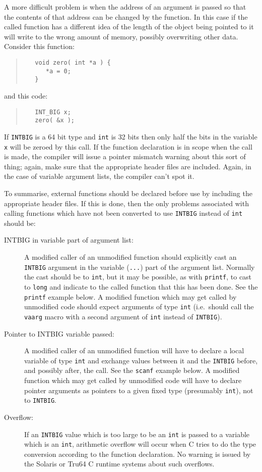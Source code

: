 \documentclass[twoside,11pt]{article}
\renewcommand{\_}{\texttt{\symbol{95}}}
\newcommand{\cc}[1]{{\tt #1}}
\newenvironment{squote}{\begin{quote}\begin{small}}{\end{small}\end{quote}}
\begin{document}
A more difficult problem is when the address of an argument is
passed so that the contents of that address can be changed by
the function.  In this case if the called function has a
different idea of the length of the object being pointed to
it will write to the wrong amount of memory, possibly overwriting
other data.  Consider this function:
\begin{squote}
\begin{verbatim}
   void zero( int *a ) {
      *a = 0;
   }
\end{verbatim}
\end{squote}
and this code:
\begin{squote}
\begin{verbatim}
   INT_BIG x;
   zero( &x );
\end{verbatim}
\end{squote}
If \cc{INT\_BIG} is a 64 bit type and \cc{int} is 32 bits
then only half the bits in the variable \cc{x} will be zeroed by this call.
If the function declaration is in scope when the call is made,
the compiler will issue a pointer mismatch warning about this sort of thing;
again, make sure that the appropriate header files are included.
Again, in the case of variable argument lists, the compiler can't spot it.

To summarise, external functions should be declared before use by
including the appropriate header files.  If this is done, then the only
problems associated with calling functions which have not been
converted to use \cc{INT\_BIG} instead of \cc{int} should be:
\begin{description}
%
\item[INT\_BIG in variable part of argument list:]
A modified caller of an unmodified function should explicitly cast
an \cc{INT\_BIG} argument in the variable (\cc{...}) part of the argument
list.
Normally the cast should be to \cc{int}, but it may be possible,
as with \cc{printf}, to cast to \cc{long} and indicate to the called
function that this has been done.
See the \cc{printf} example below.
A modified function which may get called by unmodified code
should expect arguments of type \cc{int}
(i.e.\ should call the \cc{va\_arg} macro with a second argument
of \cc{int} instead of \cc{INT\_BIG}).
%
\item[Pointer to INT\_BIG variable passed:]
A modified caller of an unmodified function will have to declare
a local variable of type \cc{int} and exchange values between it
and the \cc{INT\_BIG} before, and possibly after, the call.
See the \cc{scanf} example below.
A modified function which may get called by unmodified code
will have to declare pointer arguments as pointers to a given fixed
type (presumably \cc{int}), not to \cc{INT\_BIG}.
\item[Overflow:]
If an \cc{INT\_BIG} value which is too large to be an \cc{int}
is passed to a variable which is an \cc{int}, arithmetic overflow will
occur when C tries to do the type conversion according to the function
declaration.
No warning is issued by the Solaris or Tru64 C runtime systems about
such overflows.
\end{description}
\end{document}
